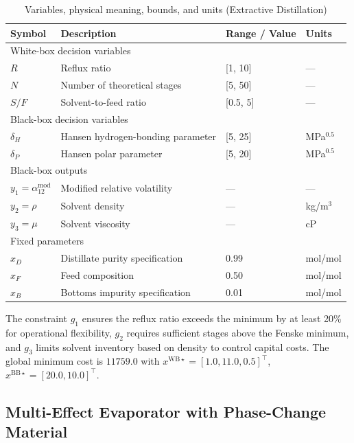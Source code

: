 \documentclass[12pt,a4paper]{article}%
\theoremstyle{plain}%
\theoremstyle{remark}%
\theoremstyle{definition}%
\def\WB{\mathrm{WB}}
\def\BB{\mathrm{BB}}
\begin{document}
\begin{appendices}
\begin{table}[htbp]
\centering
\caption{Variables, physical meaning, bounds, and units (Extractive Distillation)}
\label{tab:distillation_vars}
\begin{tabular}{@{}llll@{}}
\toprule
\textbf{Symbol} & \textbf{Description} & \textbf{Range / Value} & \textbf{Units} \\
\midrule
\multicolumn{4}{l}{White-box decision variables} \\
\midrule
$R$ & Reflux ratio & [1, 10] & --- \\
$N$ & Number of theoretical stages & [5, 50] & --- \\
$S/F$ & Solvent-to-feed ratio & [0.5, 5] & --- \\
\midrule
\multicolumn{4}{l}{Black-box decision variables} \\
\midrule
$\delta_H$ & Hansen hydrogen-bonding parameter & [5, 25] & MPa$^{0.5}$ \\
$\delta_P$ & Hansen polar parameter & [5, 20] & MPa$^{0.5}$ \\
\midrule
\multicolumn{4}{l}{Black-box outputs} \\
\midrule
$y_1 = \alpha_{12}^{\text{mod}}$ & Modified relative volatility & --- & --- \\
$y_2 = \rho$ & Solvent density & --- & kg/m$^3$ \\
$y_3 = \mu$ & Solvent viscosity & --- & cP \\
\midrule
\multicolumn{4}{l}{Fixed parameters} \\
\midrule
$x_D$ & Distillate purity specification & 0.99 & mol/mol \\
$x_F$ & Feed composition & 0.50 & mol/mol \\
$x_B$ & Bottoms impurity specification & 0.01 & mol/mol \\
\bottomrule
\end{tabular}
\end{table}

The constraint $g_1$ ensures the reflux ratio exceeds the minimum by at least 20\% for operational flexibility, $g_2$ requires sufficient stages above the Fenske minimum, and $g_3$ limits solvent inventory based on density to control capital costs. The global minimum cost is $11759.0$ with $x^{\WB\star} = [1.0, 11.0, 0.5]^\top$, $x^{\BB\star} = [20.0, 10.0]^\top$.

\subsection{Multi-Effect Evaporator with Phase-Change Material}\label{subsec:app_evaporator}


\end{appendices}
\end{document}
